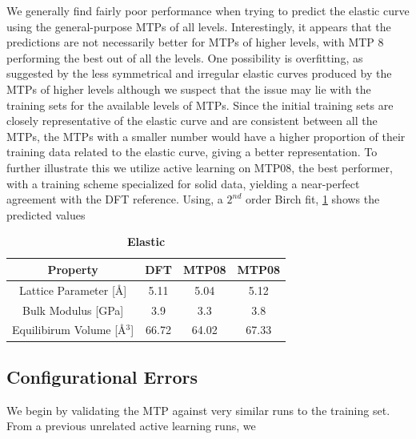 \documentclass[9pt,twocolumn,twoside]{opticajnl}
\begin{document}
We generally find fairly poor performance when trying to predict the elastic curve using the general-purpose MTPs of all levels. Interestingly, it appears that the predictions are not necessarily better for MTPs of higher levels, with MTP 8 performing the best out of all the levels. One possibility is overfitting, as suggested by the less symmetrical and irregular elastic curves produced by the MTPs of higher levels although we suspect that the issue may lie with the training sets for the available levels of MTPs. Since the initial training sets are closely representative of the elastic curve and are consistent between all the MTPs, the MTPs with a smaller number would have a higher proportion of their training data related to the elastic curve, giving a better representation. To further illustrate this we utilize active learning on MTP08, the best performer, with a training scheme specialized for solid data, yielding a near-perfect agreement with the DFT reference. Using, a $2^{nd}$ order Birch fit, \ref{tab:elastic} shows the predicted values 

\begin{table}[htbp]
  \centering
  \caption{\bf Elastic }
  \begin{tabular}{cccc}
  \hline
  Property & DFT &  MTP08 & MTP08\\ 
  \hline
  Lattice Parameter [Å] & 5.11 & 5.04 & 5.12\\
  Bulk Modulus [GPa]& 3.9 & 3.3 & 3.8\\
  Equilibirum Volume [Å$^3$]& 66.72 & 64.02 & 67.33\\
  \hline
  \end{tabular}
  \label{tab:elastic}
\end{table}

\subsection{Configurational Errors}
We begin by validating the MTP against very similar runs to the training set. From a previous unrelated active learning runs, we 



\end{document}

